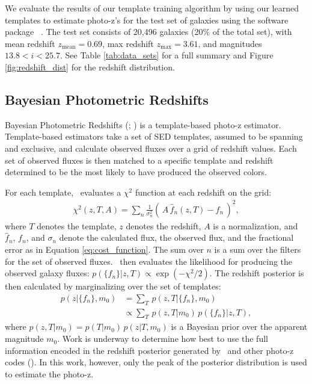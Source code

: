 
\label{sect:photoz}

We evaluate the results of our template training algorithm by using our learned templates to estimate photo-z's for the test set of galaxies using the software package \bpz\ \citep{Benitez2000a}.
The test set consists of 20,496 galaxies (20\% of the total set), with mean redshift $z_\text{mean} = 0.69$, max redshift $z_\text{max} = 3.61$, and magnitudes $13.8 < i < 25.7$.
See Table \ref{tab:data_sets} for a full summary and Figure \ref{fig:redshift_dist} for the redshift distribution.

\subsection{Bayesian Photometric Redshifts}
\label{sect:bpz}

Bayesian Photometric Redshifts (\bpz; \citealt{Benitez2000a}) is a template-based photo-z estimator.
Template-based estimators take a set of SED templates, assumed to be spanning and exclusive, and calculate observed fluxes over a grid of redshift values. 
Each set of observed fluxes is then matched to a specific template and redshift determined to be the most likely to have produced the observed colors. 

For each template, \bpz\ evaluates a $\chi^2$ function at each redshift on the grid:
\begin{align}
    \chi^2 (z,T,A) = \sum_n \frac{1}{\sigma_n^2} (\, A \, \hat{f}_n(z,T) - f_n \,)^2,
    \label{eq:chi2}
\end{align}
where $T$ denotes the template, $z$ denotes the redshift, $A$ is a normalization, and $\hat{f}_n$, $f_n$, and $\sigma_n$ denote the calculated flux, the observed flux, and the fractional error as in Equation \ref{eq:cost_function}. 
The sum over $n$ is a sum over the filters for the set of observed fluxes. 
\bpz\ then evaluates the likelihood for producing the observed galaxy fluxes: $p(\{f_n\}|z,T) \propto \exp{(-\chi^2/2)}$. 
The redshift posterior is then calculated by marginalizing over the set of templates:
\begin{align}
    p(z|\{f_n\},m_0) &= \sum_T \, p(z,T|\{f_n\},m_0) \nonumber \\
                     &\propto \sum_T \, p(z,T|m_0) \, p(\{f_n\}|z,T),
\end{align}
where $p(z,T|m_0) = p(T|m_0) \, p(z|T,m_0)$ is a Bayesian prior over the apparent magnitude $m_0$. 
Work is underway to determine how best to use the full information encoded in the redshift posterior generated by \bpz\ and other photo-z codes (). 
In this work, however, only the peak of the posterior distribution is used to estimate the photo-z.

